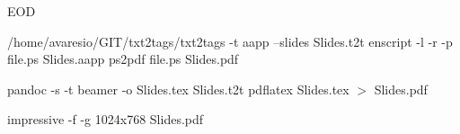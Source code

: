 \documentclass{article}
\begin{document}
\clearpage

EOD

\clearpage

/home/avaresio/GIT/txt2tags/txt2tags -t aapp --slides Slides.t2t
enscript -l -r -p file.ps Slides.aapp
ps2pdf file.ps Slides.pdf

pandoc -s -t beamer -o Slides.tex Slides.t2t
pdflatex Slides.tex $>$ Slides.pdf

impressive -f -g 1024x768 Slides.pdf

\end{document}
